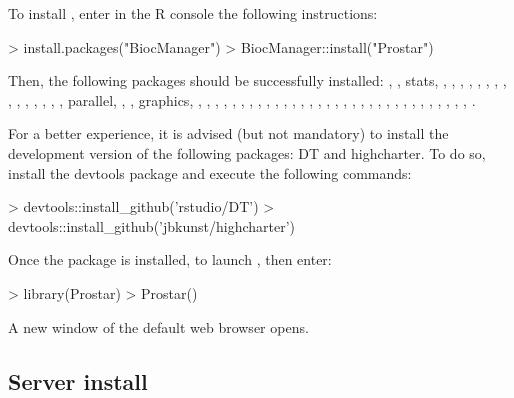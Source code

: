 \documentclass[12pt]{article}
\begin{document}
To install , enter in the R console the following instructions:
\begin{Schunk}
\begin{Sinput}
> install.packages("BiocManager")
> BiocManager::install("Prostar")
\end{Sinput}
\end{Schunk}

Then, the following packages should be successfully installed: , , stats, , , , , , , , , , , , , , , , parallel, , , graphics, , , , , , , , , , , , , , , , , , , ,  , , , , , , , , , , , , , .

For a better experience, it is advised (but not mandatory) to install the development version of the following packages: DT and highcharter. To do so, install the devtools package and execute the following commands:
\begin{Schunk}
\begin{Sinput}
> devtools::install_github('rstudio/DT')
> devtools::install_github('jbkunst/highcharter')
\end{Sinput}
\end{Schunk}

Once the package is installed, to launch , then enter:
\begin{Schunk}
\begin{Sinput}
> library(Prostar)
> Prostar()
\end{Sinput}
\end{Schunk}

A new window of the default web browser opens. 

\subsection{Server install} \label{sec:daparProstarserver}
\end{document}
